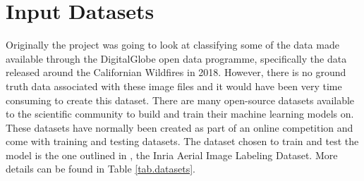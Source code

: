 \chapter{Input Datasets}
Originally the project was going to look at classifying some of the data made available through the DigitalGlobe open data programme, specifically the data released around the Californian Wildfires in 2018. However, there is no ground truth data associated with these image files and it would have been very time consuming to create this dataset. There are many open-source datasets available to the scientific community to build and train their machine learning models on. These datasets have normally been created as part of an online competition and come with training and testing datasets. The dataset chosen to train and test the model is the one outlined in \cite{maggiori17a}, the Inria Aerial Image Labeling Dataset. More details can be found in Table \ref{tab.datasets}.
\par

